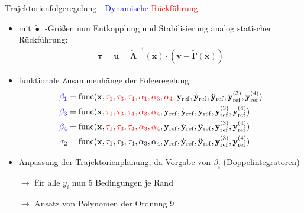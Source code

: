\documentclass[
	ngerman,
	10pt,				%
	aspectratio=169 	%
]{beamer}
\begin{document}
\begin{frame}[t,fragile,label=trajektorienregelung_6]{\large Trajektorienfolgeregelung - \textcolor{blue}{Dynamische} \textcolor{red}{Rückführung}}
	
	\begin{itemize}
		\item mit $\tilde{\bullet}$~-Größen nun Entkopplung und Stabilisierung analog statischer Rückführung:
		\begin{align*}
			\tilde{\boldsymbol{\tau}} = \mathbf{u} = \tilde{\boldsymbol{\Lambda }}^{-1}(\mathbf{x}) \cdot (\mathbf{v} - \tilde{\boldsymbol{\Gamma}}(\mathbf{x}))
		\end{align*}
		\pause
		\item funktionale Zusammenhänge der Folgeregelung:
		\begin{align*}
			\textcolor{blue}{\beta_1} &= \mathrm{func}(\mathbf{x}, \textcolor{red}{\tau_1, \tau_3, \tau_4, \alpha_1, \alpha_3, \alpha_4}, \mathbf{y}_{\mathrm{ref}}, \dot{\mathbf{y}}_{\mathrm{ref}}, \ddot{\mathbf{y}}_{\mathrm{ref}}, \mathbf{y}_{\mathrm{ref}}^{(3)}, \mathbf{y}_{\mathrm{ref}}^{(4)}) \\
			\textcolor{blue}{\beta_3} &= \mathrm{func}(\mathbf{x}, \textcolor{red}{\tau_1, \tau_3, \tau_4, \alpha_3, \alpha_4}, \mathbf{y}_{\mathrm{ref}}, \dot{\mathbf{y}}_{\mathrm{ref}}, \ddot{\mathbf{y}}_{\mathrm{ref}}, \mathbf{y}_{\mathrm{ref}}^{(3)}, \mathbf{y}_{\mathrm{ref}}^{(4)}) \\
			\textcolor{blue}{\beta_4} &= \mathrm{func}(\mathbf{x}, \textcolor{red}{\tau_1, \tau_3, \tau_4, \alpha_3, \alpha_4}, \mathbf{y}_{\mathrm{ref}}, \dot{\mathbf{y}}_{\mathrm{ref}}, \ddot{\mathbf{y}}_{\mathrm{ref}}, \mathbf{y}_{\mathrm{ref}}^{(3)}, \mathbf{y}_{\mathrm{ref}}^{(4)}) \\
			\tau_2 &= \mathrm{func}(\mathbf{x}, \tau_1, \tau_3, \tau_4, \alpha_3, \alpha_4, \mathbf{y}_{\mathrm{ref}}, \dot{\mathbf{y}}_{\mathrm{ref}}, \ddot{\mathbf{y}}_{\mathrm{ref}}, \mathbf{y}_{\mathrm{ref}}^{(3)}, \mathbf{y}_{\mathrm{ref}}^{(4)})
		\end{align*}
		\pause
		\item Anpassung der Trajektorienplanung, da Vorgabe von $\beta_i$ (Doppelintegratoren)
		\pause
		\item[$\rightarrow$] für alle $y_i$ nun 5 Bedingungen je Rand
		\item[$\rightarrow$] Ansatz von Polynomen der Ordnung 9
	\end{itemize}
	
\end{frame}
\end{document}
